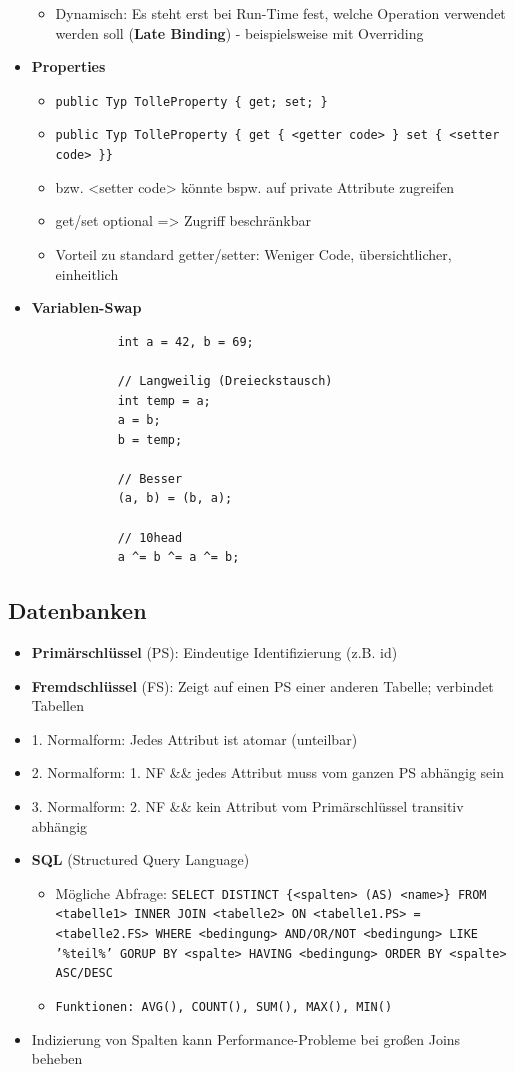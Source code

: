 \documentclass[a4paper, 11pt]{article}
\begin{document}
\begin{itemize}
\begin{itemize}
		      \item Dynamisch: Es steht erst bei Run-Time fest, welche Operation verwendet werden soll (\textbf{Late Binding}) - beispielsweise mit Overriding
	      \end{itemize}
	\item \textbf{Properties}
	      \begin{itemize}
		      \item \texttt{public Typ TolleProperty \{ get; set; \}}
		      \item \texttt{public Typ TolleProperty \{ get \{ <getter code> \} set \{ <setter code> \}\}}
		      \item <getter code> bzw. <setter code> könnte bspw. auf private Attribute zugreifen
		      \item get/set optional => Zugriff beschränkbar
		      \item Vorteil zu standard getter/setter: Weniger Code, übersichtlicher, einheitlich
	      \end{itemize}
	\item \textbf{Variablen-Swap}
	      \begin{verbatim}
			int a = 42, b = 69;	
			
			// Langweilig (Dreieckstausch)
			int temp = a;
			a = b;
			b = temp;

			// Besser
			(a, b) = (b, a);

			// 10head
			a ^= b ^= a ^= b;

		\end{verbatim}
\end{itemize}

\subsection{Datenbanken}
\begin{itemize}
	\item \textbf{Primärschlüssel} (PS): Eindeutige Identifizierung (z.B. id)
	\item \textbf{Fremdschlüssel} (FS): Zeigt auf einen PS einer anderen Tabelle; verbindet Tabellen
	\item 1. Normalform: Jedes Attribut ist atomar (unteilbar)
	\item 2. Normalform: 1. NF \&\& jedes Attribut muss vom ganzen PS abhängig sein
	\item 3. Normalform: 2. NF \&\& kein Attribut vom Primärschlüssel transitiv abhängig
	\item \textbf{SQL} (Structured Query Language)
	      \begin{itemize}
		      \item Mögliche Abfrage: \texttt{SELECT DISTINCT \{<spalten> (AS) <name>\} FROM <tabelle1> INNER JOIN <tabelle2> ON <tabelle1.PS> = <tabelle2.FS> WHERE <bedingung> AND/OR/NOT <bedingung> LIKE '\%teil\%' GORUP BY <spalte> HAVING <bedingung> ORDER BY <spalte> ASC/DESC}
		      \item \texttt{Funktionen: AVG(), COUNT(), SUM(), MAX(), MIN()}
	      \end{itemize}
	\item Indizierung von Spalten kann Performance-Probleme bei großen Joins beheben
\end{itemize}
\end{document}
